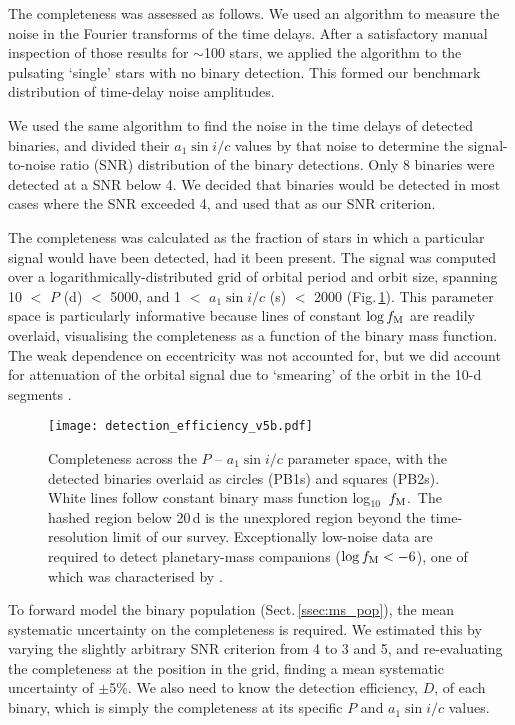 \documentclass[a4paper,fleqn,usenatbib]{mnras}
\begin{document}
The completeness was assessed as follows. We used an algorithm to measure the noise in the Fourier transforms of the time delays. After a satisfactory manual inspection of those results for $\sim$100 stars, we applied the algorithm to the pulsating `single' stars with no binary detection. This formed our benchmark distribution of time-delay noise amplitudes.

We used the same algorithm to find the noise in the time delays of detected binaries, and divided their $a_1 \sin i/c$ values by that noise to determine the signal-to-noise ratio (SNR) distribution of the binary detections. Only 8 binaries were detected at a SNR below 4. We decided that binaries would be detected in most cases where the SNR exceeded 4, and used that as our SNR criterion.

The completeness was calculated as the fraction of stars in which a particular signal would have been detected, had it been present. The signal was computed over a logarithmically-distributed grid of orbital period and orbit size, spanning 10 $<$ $P$ (d) $<$ 5000, and 1 $<$ $a_1 \sin i/c$ (s) $<$  2000 (Fig.\,\ref{fig:detection_rate}). This parameter space is particularly informative because lines of constant $\log f_{\rm M}$ are readily overlaid, visualising the completeness as a function of the binary mass function. The weak dependence on eccentricity was not accounted for, but we did account for attenuation of the orbital signal due to `smearing' of the orbit in the 10-d segments \citep{murphyetal2016b}.


\begin{figure}
\begin{center}
\texttt{[image: detection\_efficiency\_v5b.pdf]}
\caption{Completeness across the $P$ -- $a_1 \sin i / c$ parameter space, with the detected binaries overlaid as circles (PB1s) and squares (PB2s). White lines follow constant binary mass function \mbox{log$_{10}$~$f_{\rm M}$}.\protect\footnotemark\ The hashed region below 20\,d is the unexplored region beyond the time-resolution limit of our survey. Exceptionally low-noise data are required to detect planetary-mass companions ($\log f_{\rm M} < -6$), one of which was characterised by \citet{murphyetal2016c}.}
\label{fig:detection_rate}
\end{center}
\end{figure}


To forward model the binary population (Sect.\,\ref{ssec:ms_pop}), the mean systematic uncertainty on the completeness is required. We estimated this by varying the slightly arbitrary SNR criterion from 4 to 3 and 5, and re-evaluating the completeness at the position in the grid, finding a mean systematic uncertainty of $\pm$5\%. We also need to know the detection efficiency, $D$, of each binary, which is simply the completeness at its specific $P$ and $a_1 \sin i / c$ values. %
\end{document}
